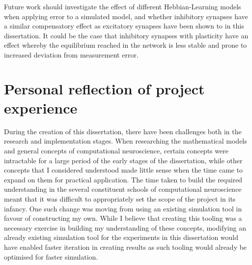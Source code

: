 Future work should investigate the effect of different Hebbian-Learning models
when applying error to a simulated model, and whether inhibitory synapses have a
similar compensatory effect as excitatory synapses have been shown to in this
dissertation. It could be the case that inhibitory synapses with plasticity have
an effect whereby the equilibrium reached in the network is less stable and
prone to increased deviation from measurement error.

\section{Personal reflection of project experience}
 



During the creation of this dissertation, there have been challenges both in the
research and implementation stages. When researching the mathematical models and
general concepts of computational neuroscience, certain concepts were
intractable for a large period of the early stages of the dissertation, while
other concepts that I considered understood made little sense when the time came
to expand on them for practical application. The time taken to build the
required understanding in the several constituent schools of computational
neuroscience meant that it was difficult to appropriately set the scope of the
project in its infancy. One such change was moving from using an existing
simulation tool in favour of constructing my own. While I believe that creating this tooling was a
necessary exercise in building my understanding of these concepts, modifying an
already existing simulation tool for the experiments in this dissertation would
have enabled faster iteration in creating results as such tooling would already
be optimised for faster simulation.

